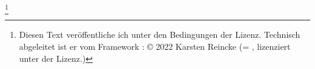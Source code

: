 
\footnote{Diesen Text veröffentliche ich unter den Bedingungen der  Lizenz. Technisch abgeleitet ist er vom Framework : \copyright{} 2022 Karsten Reincke (= , lizenziert unter der  Lizenz.)}
